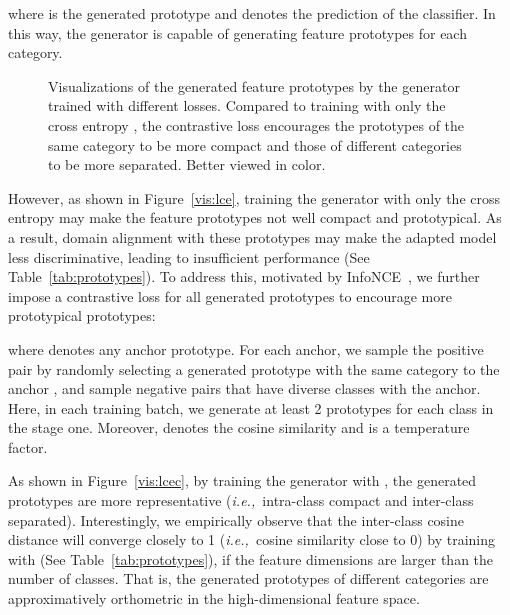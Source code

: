 \documentclass{article}
\def\ie{\emph{i.e.,~}}
\begin{document}
where  is the generated prototype and  denotes the prediction of the classifier.
In this way, the generator is capable of generating feature prototypes for each category.  

\begin{figure}[t]
\centering
\begin{minipage}{0.49\linewidth}
\end{minipage}
\begin{minipage}{0.49\linewidth}
\end{minipage}
\label{figdata}
\caption{Visualizations of the generated feature prototypes by the generator  trained with different losses. Compared to training with only the cross entropy   , the contrastive loss 
encourages the prototypes of the same category to be more compact and those of different categories to be more separated. Better viewed in color.}
\label{vis:lce_total}
\end{figure}

However, as shown in Figure~\ref{vis:lce}, training the generator with only the cross entropy may make the feature prototypes not well compact and prototypical. As a result, domain alignment with these prototypes may make the adapted model less discriminative, leading to insufficient   performance (See Table~\ref{tab:prototypes}). To address this, motivated by InfoNCE~\cite{Oord2018RepresentationLW,Zhang2021UnleashingTP}, we further impose a contrastive loss for all generated prototypes to encourage more prototypical prototypes:

where  denotes any anchor prototype. For each anchor,  we sample  the positive pair   by randomly selecting a generated prototype  with  the same category to the anchor ,    and sample  negative pairs   that have diverse classes with the anchor. Here,  in each training batch, we generate at least 2 prototypes for each class in the stage one. Moreover,  denotes the cosine similarity and  is a temperature factor.





As shown in Figure~\ref{vis:lcec}, by training the generator with , the generated prototypes are more representative (\ie intra-class compact and   inter-class separated). Interestingly, we empirically observe that the inter-class cosine distance will converge closely to 1 (\ie cosine similarity close to 0) by training with  (See Table~\ref{tab:prototypes}),  if the feature dimensions are larger than the number of classes. That is, the generated prototypes of different categories are approximatively orthometric in the high-dimensional feature space.  
\end{document}
